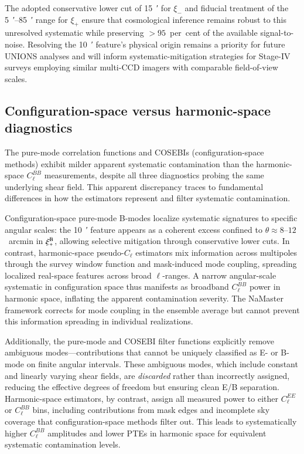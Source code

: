 \documentclass{aa}
\begin{document}
The adopted conservative lower cut of \SI{15}{\arcmin} for $\xi_-$ and fiducial treatment of the \SIrange{5}{85}{\arcmin} range for $\xi_+$ ensure that cosmological inference remains robust to this unresolved systematic while preserving $> 95$~per~cent of the available signal-to-noise. Resolving the \SI{10}{\arcmin} feature's physical origin remains a priority for future UNIONS analyses and will inform systematic-mitigation strategies for Stage-IV surveys employing similar multi-CCD imagers with comparable field-of-view scales.

\subsection{Configuration-space versus harmonic-space diagnostics}

The pure-mode correlation functions and COSEBIs (configuration-space methods) exhibit milder apparent systematic contamination than the harmonic-space $C_\ell^{BB}$ measurements, despite all three diagnostics probing the same underlying shear field. This apparent discrepancy traces to fundamental differences in how the estimators represent and filter systematic contamination.

Configuration-space pure-mode B-modes localize systematic signatures to specific angular scales: the \SI{10}{\arcmin} feature appears as a coherent excess confined to $\theta \approx 8$--$12$~arcmin in $\xi_+^{\rm B}$, allowing selective mitigation through conservative lower cuts. In contrast, harmonic-space pseudo-$C_\ell$ estimators mix information across multipoles through the survey window function and mask-induced mode coupling, spreading localized real-space features across broad $\ell$-ranges. A narrow angular-scale systematic in configuration space thus manifests as broadband $C_\ell^{BB}$ power in harmonic space, inflating the apparent contamination severity. The NaMaster framework corrects for mode coupling in the ensemble average but cannot prevent this information spreading in individual realizations.

Additionally, the pure-mode and COSEBI filter functions explicitly remove ambiguous modes—contributions that cannot be uniquely classified as E- or B-mode on finite angular intervals. These ambiguous modes, which include constant and linearly varying shear fields, are \emph{discarded} rather than incorrectly assigned, reducing the effective degrees of freedom but ensuring clean E/B separation. Harmonic-space estimators, by contrast, assign all measured power to either $C_\ell^{EE}$ or $C_\ell^{BB}$ bins, including contributions from mask edges and incomplete sky coverage that configuration-space methods filter out. This leads to systematically higher $C_\ell^{BB}$ amplitudes and lower PTEs in harmonic space for equivalent systematic contamination levels.
\end{document}
